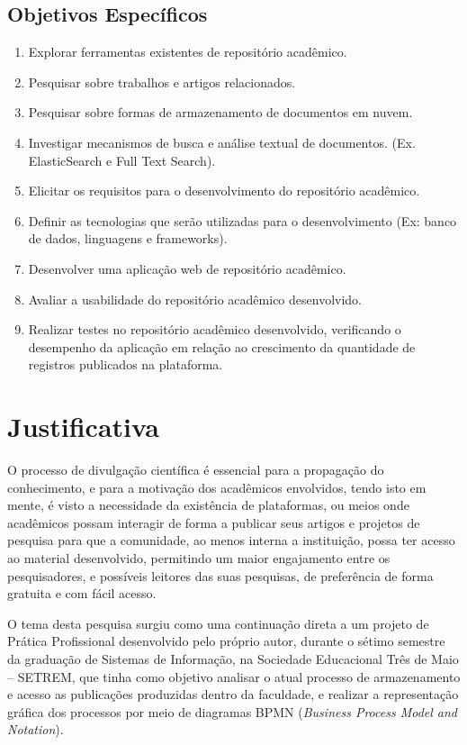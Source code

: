 \subsection{Objetivos Específicos}
\begin{enumerate}
    \item Explorar ferramentas existentes de repositório acadêmico.
    \item Pesquisar sobre trabalhos e artigos relacionados.
    \item Pesquisar sobre formas de armazenamento de documentos em nuvem.
    \item Investigar mecanismos de busca e análise textual de documentos. (Ex. ElasticSearch e Full Text Search).
    \item Elicitar os requisitos para o desenvolvimento do repositório acadêmico.
    \item Definir as tecnologias que serão utilizadas para o desenvolvimento (Ex: banco de dados, linguagens e frameworks).
    \item Desenvolver uma aplicação web de repositório acadêmico.
    \item Avaliar a usabilidade do repositório acadêmico desenvolvido.
    \item Realizar testes no repositório acadêmico desenvolvido, verificando o desempenho da aplicação em relação ao crescimento da quantidade de registros publicados na plataforma.

\end{enumerate}


\section{Justificativa}\label{sec:justification}

O processo de divulgação científica é essencial para a propagação do
conhecimento, e para a motivação dos acadêmicos envolvidos,
tendo isto em mente, é visto a necessidade da existência de plataformas,
ou meios onde acadêmicos possam interagir de forma a publicar
seus artigos e projetos de pesquisa para que a comunidade, ao menos interna a instituição,
possa ter acesso ao material desenvolvido, permitindo um maior engajamento
entre os pesquisadores, e possíveis leitores das suas pesquisas,
de preferência de forma gratuita e com fácil acesso.

O tema desta pesquisa surgiu como uma continuação direta a um projeto
de Prática Profissional desenvolvido pelo próprio autor, durante o sétimo
semestre da graduação de Sistemas de Informação, na Sociedade Educacional
Três de Maio – SETREM, que tinha como objetivo analisar o atual processo
de armazenamento e acesso as publicações produzidas dentro da faculdade,
e realizar a representação gráfica dos processos por meio de diagramas BPMN
(\emph{Business Process Model and Notation}).

